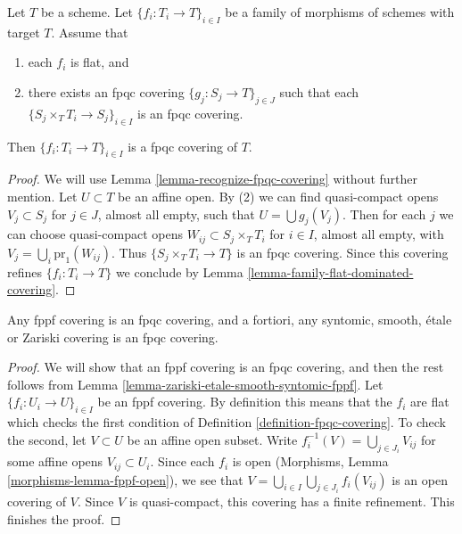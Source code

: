 \begin{lemma}
\label{lemma-family-flat-fpqc-local-covering}
Let $T$ be a scheme. Let $\{f_i : T_i \to T\}_{i \in I}$ be a family of
morphisms of schemes with target $T$. Assume that
\begin{enumerate}
\item each $f_i$ is flat, and
\item there exists an fpqc covering
$\{g_j : S_j \to T\}_{j \in J}$ such that each
$\{S_j \times_T T_i \to S_j\}_{i \in I}$ is an fpqc covering.
\end{enumerate}
Then $\{f_i : T_i \to T\}_{i \in I}$ is a fpqc covering of $T$.
\end{lemma}

\begin{proof}
We will use Lemma \ref{lemma-recognize-fpqc-covering} without further
mention. Let $U \subset T$ be an affine open. By (2) we can find
quasi-compact opens $V_j \subset S_j$ for $j \in J$, almost all empty, such that
$U = \bigcup g_j(V_j)$. Then for each $j$ we can choose quasi-compact
opens $W_{ij} \subset S_j \times_T T_i$ for $i \in I$, almost all empty,
with $V_j = \bigcup_i \text{pr}_1(W_{ij})$. Thus
$\{S_j \times_T T_i \to T\}$ is an fpqc covering.
Since this covering refines $\{f_i : T_i \to T\}$ we conclude by
Lemma \ref{lemma-family-flat-dominated-covering}.
\end{proof}

\begin{lemma}
\label{lemma-zariski-etale-smooth-syntomic-fppf-fpqc}
Any fppf covering is an fpqc covering, and a fortiori,
any syntomic, smooth, \'etale or Zariski covering is an fpqc covering.
\end{lemma}

\begin{proof}
We will show that an fppf covering is an fpqc covering, and then the
rest follows from
Lemma \ref{lemma-zariski-etale-smooth-syntomic-fppf}.
Let $\{f_i : U_i \to U\}_{i \in I}$ be an fppf covering.
By definition this means that the $f_i$ are flat which checks the first
condition of Definition \ref{definition-fpqc-covering}. To check the
second, let $V \subset U$ be an affine open subset.
Write $f_i^{-1}(V) = \bigcup_{j \in J_i} V_{ij}$
for some affine opens $V_{ij} \subset U_i$. Since each $f_i$ is open
(Morphisms, Lemma \ref{morphisms-lemma-fppf-open}), we see that
$V = \bigcup_{i\in I} \bigcup_{j \in J_i} f_i(V_{ij})$
is an open covering of $V$.
Since $V$ is quasi-compact, this covering has a finite
refinement. This finishes the proof.
\end{proof}

